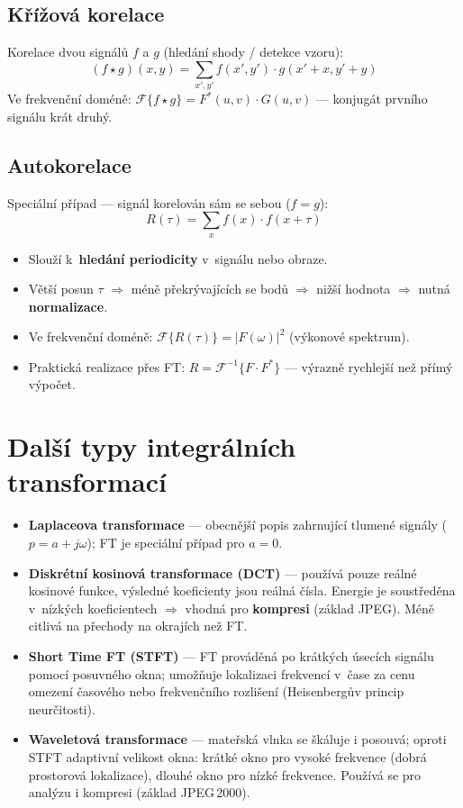\subsection*{Křížová korelace}
 
Korelace dvou signálů $f$ a $g$ (hledání shody / detekce vzoru):
\[
  (f \star g)(x,y) = \sum_{x',y'} f(x', y') \cdot g(x'+x, y'+y)
\]
Ve frekvenční doméně: $\mathcal{F}\{f \star g\} = F^*(u,v) \cdot G(u,v)$ — konjugát prvního signálu krát druhý.
 
\subsection*{Autokorelace}
 
Speciální případ — signál korelován sám se sebou ($f = g$):
\[
  R(\tau) = \sum_x f(x) \cdot f(x + \tau)
\]
\begin{itemize}
  \item Slouží k~\textbf{hledání periodicity} v~signálu nebo obraze.
  \item Větší posun $\tau$ $\Rightarrow$ méně překrývajících se bodů $\Rightarrow$ nižší hodnota $\Rightarrow$ nutná \textbf{normalizace}.
  \item Ve frekvenční doméně: $\mathcal{F}\{R(\tau)\} = |F(\omega)|^2$ (výkonové spektrum).
  \item Praktická realizace přes FT: $R = \mathcal{F}^{-1}\{F \cdot F^*\}$ — výrazně rychlejší než přímý výpočet.
\end{itemize}
 
\section*{Další typy integrálních transformací}
 
\begin{itemize}
  \item \textbf{Laplaceova transformace} — obecnější popis zahrnující tlumené signály ($p = a + j\omega$); FT je speciální případ pro $a = 0$.
  \item \textbf{Diskrétní kosinová transformace (DCT)} — používá pouze reálné kosinové funkce, výsledné koeficienty jsou reálná čísla. Energie je soustředěna v~nízkých koeficientech $\Rightarrow$ vhodná pro \textbf{kompresi} (základ JPEG). Méně citlivá na přechody na okrajích než FT.
  \item \textbf{Short Time FT (STFT)} — FT prováděná po krátkých úsecích signálu pomocí posuvného okna; umožňuje lokalizaci frekvencí v~čase za cenu omezení časového nebo frekvenčního rozlišení (Heisenbergův princip neurčitosti).
  \item \textbf{Waveletová transformace} — mateřská vlnka se škáluje i posouvá; oproti STFT adaptivní velikost okna: krátké okno pro vysoké frekvence (dobrá prostorová lokalizace), dlouhé okno pro nízké frekvence. Používá se pro analýzu i kompresi (základ JPEG\,2000).
\end{itemize}



